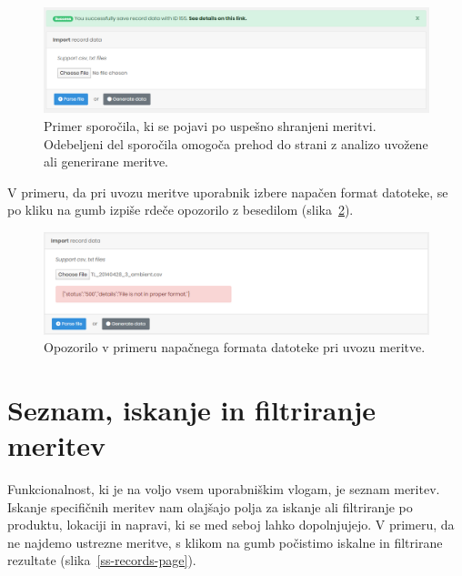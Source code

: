 \documentclass[a4paper, 12pt]{book}
\begin{document}
\begin{figure}[h]
\begin{center}
\includegraphics[width=\textwidth]{slike/import_success.png}
\end{center}
\caption{Primer sporočila, ki se pojavi po uspešno shranjeni meritvi. Odebeljeni del sporočila omogoča prehod do strani z analizo uvožene ali generirane meritve.}
\label{ss-import-success}
\end{figure}

V primeru, da pri uvozu meritve uporabnik izbere napačen format datoteke, se po kliku na gumb  izpiše rdeče opozorilo z besedilom  (slika~\ref{ss-import-error}).

\begin{figure}[h]
\begin{center}
\includegraphics[width=\textwidth]{slike/import_error.png}
\end{center}
\caption{Opozorilo v primeru napačnega formata datoteke pri uvozu meritve.}
\label{ss-import-error}
\end{figure}


\section{Seznam, iskanje in filtriranje meritev}

Funkcionalnost, ki je na voljo vsem uporabniškim vlogam, je seznam meritev. Iskanje specifičnih meritev nam olajšajo polja za iskanje ali filtriranje po produktu, lokaciji in napravi, ki se med seboj lahko dopolnjujejo.
V primeru, da ne najdemo ustrezne meritve, s klikom na gumb  počistimo iskalne in filtrirane rezultate (slika~\ref{ss-records-page}).
\end{document}
